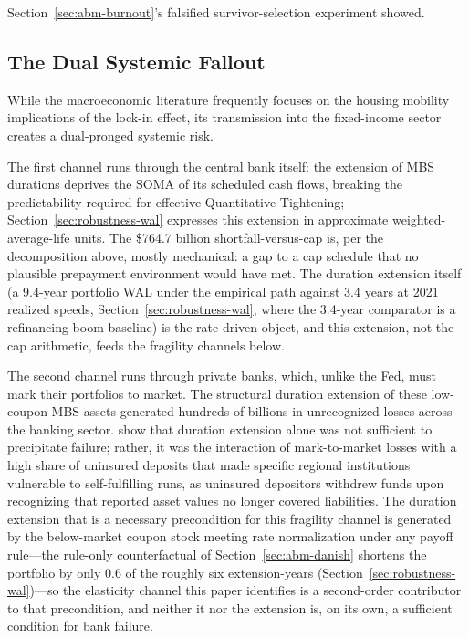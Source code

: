 \documentclass[12pt]{article}
\begin{document}
Section~\ref{sec:abm-burnout}'s falsified survivor-selection experiment showed.

\subsection{The Dual Systemic Fallout}\label{sec:discussion-fallout}

While the macroeconomic literature frequently focuses on the housing mobility implications of the lock-in effect, its transmission into the fixed-income sector creates a dual-pronged systemic risk.

The first channel runs through the central bank itself: the extension of MBS durations deprives the SOMA of its scheduled cash flows, breaking the predictability required for effective Quantitative Tightening; Section~\ref{sec:robustness-wal} expresses this extension in approximate weighted-average-life units. The \$764.7 billion shortfall-versus-cap is, per the decomposition above, mostly mechanical: a gap to a cap schedule that no plausible prepayment environment would have met. The duration extension itself (a 9.4-year portfolio WAL under the empirical path against 3.4 years at 2021 realized speeds, Section~\ref{sec:robustness-wal}, where the 3.4-year comparator is a refinancing-boom baseline) is the rate-driven object, and this extension, not the cap arithmetic, feeds the fragility channels below.

The second channel runs through private banks, which, unlike the Fed, must mark their portfolios to market. The structural duration extension of these low-coupon MBS assets generated hundreds of billions in unrecognized losses across the banking sector. \citet{jiang2023} show that duration extension alone was not sufficient to precipitate failure; rather, it was the interaction of mark-to-market losses with a high share of uninsured deposits that made specific regional institutions vulnerable to self-fulfilling runs, as uninsured depositors withdrew funds upon recognizing that reported asset values no longer covered liabilities. The duration extension that is a necessary precondition for this fragility channel is generated by the below-market coupon stock meeting rate normalization under any payoff rule---the rule-only counterfactual of Section~\ref{sec:abm-danish} shortens the portfolio by only 0.6 of the roughly six extension-years (Section~\ref{sec:robustness-wal})---so the elasticity channel this paper identifies is a second-order contributor to that precondition, and neither it nor the extension is, on its own, a sufficient condition for bank failure.
\end{document}
